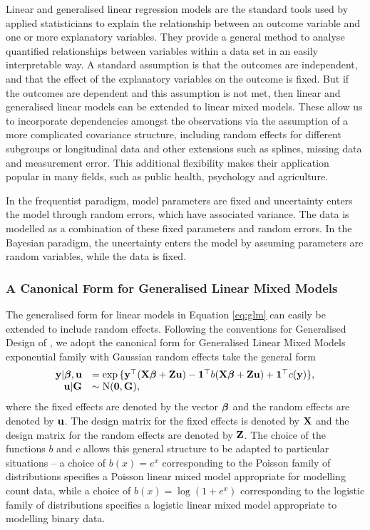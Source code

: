 Linear and generalised linear regression models are the standard tools used by applied
statisticians to explain the relationship between an outcome variable and one or more explanatory variables.
They provide a general method  to analyse quantified relationships between variables within a data set in an
easily interpretable way. A standard assumption is that the outcomes are independent, and that the effect of
the explanatory variables on the outcome is fixed. But if the outcomes are dependent and this assumption is
not met, then linear and generalised linear models can be extended to linear mixed models. These allow us to
incorporate dependencies amongst the  observations via the assumption of a more complicated covariance
structure, including random effects for  different subgroups or longitudinal data and other extensions such as
splines, missing data and measurement error. This additional flexibility makes their application popular in
many fields, such as public health, psychology and agriculture.


In the frequentist paradigm, model parameters are fixed and uncertainty enters the model through random
errors, which have associated variance. The data is modelled as a combination of these fixed parameters and
random errors. In the Bayesian paradigm, the uncertainty enters the model by assuming parameters are random
variables, while the data is fixed.

\subsubsection{A Canonical Form for Generalised Linear Mixed Models}
The generalised form for linear models in Equation \ref{eq:glm} can easily be extended to include random
effects.  Following the conventions for Generalised Design of \citep{Zhao2006}, we adopt the canonical form
for Generalised Linear Mixed Models exponential family with Gaussian random effects take the general form
$$
\begin{array}{rl}\label{eq:glmm}
	{\bf y} | {\boldsymbol \beta}, {\bf u} &= \exp{\{ {\bf y}^\top ({\bf X}{\boldsymbol\beta}+ {\bf Z}{\bf u}) - {\bf1}^\top b({\bf X}{\boldsymbol\beta}+ {\bf Z}{\bf u}) + {\bf1}^\top c({\bf y}) \}}, \\
	{\bf u} | {\bf G} &\sim \text{N}({\bf 0}, {\bf G}),
\end{array}
$$
where the fixed effects are denoted by the vector ${\boldsymbol \beta}$ and the random effects are denoted by ${\bf u}$. The
design matrix for the fixed effects is denoted by ${\bf X}$ and the design matrix for the random effects are
denoted by ${\bf Z}$. The choice of the functions $b$ and $c$ allows this general structure to be adapted to
particular situations -- a choice of $b(x) = e^x$ corresponding to the Poisson family of distributions
specifies a Poisson linear mixed model appropriate for modelling count data, while a choice of $b(x) = \log(1
+ e^x)$ corresponding to the logistic family of distributions specifies a logistic linear mixed model
appropriate to modelling binary data.

